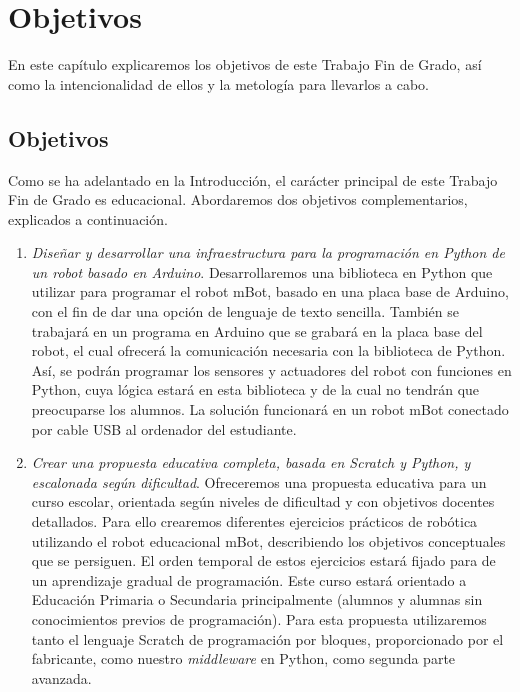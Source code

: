 \chapter{Objetivos}
\label{cap:objetivos}
En este capítulo explicaremos los objetivos de este Trabajo Fin de Grado, así como la intencionalidad de ellos y la metología para llevarlos a cabo.
\section{Objetivos}\label{sec:objetivos}
Como se ha adelantado en la Introducción, el carácter principal de este Trabajo Fin de Grado es educacional. Abordaremos dos objetivos complementarios, explicados a continuación. 

\begin{enumerate}
	\item \textit{Diseñar y desarrollar una infraestructura para la programación en Python de un robot basado en Arduino}. Desarrollaremos una biblioteca en Python que utilizar para programar el robot mBot, basado en una placa base de Arduino, con el fin de dar una opción de lenguaje de texto sencilla. También se trabajará en un programa en Arduino que se grabará en la placa base del robot, el cual ofrecerá la comunicación necesaria con la biblioteca de Python. Así, se podrán programar los sensores y actuadores del robot con funciones en Python, cuya lógica estará en esta biblioteca y de la cual no tendrán que preocuparse los alumnos. La solución funcionará en un robot mBot conectado por cable USB al ordenador del estudiante.
	
	\item \textit{Crear una propuesta educativa completa, basada en Scratch y Python, y escalonada según dificultad}. Ofreceremos una propuesta educativa para un curso escolar, orientada según niveles de dificultad y con objetivos docentes detallados. Para ello crearemos diferentes ejercicios prácticos de robótica utilizando el robot educacional mBot, describiendo los objetivos conceptuales que se persiguen. El orden temporal de estos ejercicios estará fijado para de un aprendizaje gradual de programación. Este curso estará orientado a Educación Primaria o Secundaria principalmente (alumnos y alumnas sin conocimientos previos de programación). Para esta propuesta utilizaremos tanto el lenguaje Scratch de programación por bloques, proporcionado por el fabricante, como nuestro \textit{middleware} en Python, como segunda parte avanzada.
\end{enumerate}


